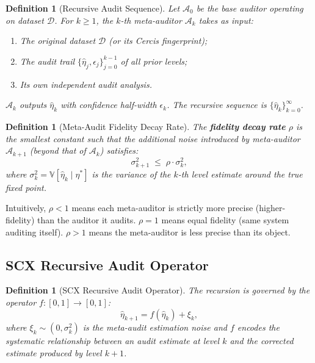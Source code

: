\documentclass[12pt,a4paper]{article}
\newtheorem{definition}[theorem]{Definition}
\newcommand{\V}{\mathbb{V}}
\newcommand{\cD}{\mathcal{D}}
\newcommand{\cA}{\mathcal{A}}
\begin{document}
\begin{definition}[Recursive Audit Sequence]
\label{def:recursive-seq}
Let $\cA_0$ be the base auditor operating on dataset $\cD$.
For $k\geq1$, the $k$-th meta-auditor $\cA_k$ takes as input:
\begin{enumerate}[label=(\roman*)]
    \item The original dataset $\cD$ (or its Cercis fingerprint);
    \item The audit trail $\{\hat{\eta}_j,\epsilon_j\}_{j=0}^{k-1}$ of all
          prior levels;
    \item Its own independent audit analysis.
\end{enumerate}
$\cA_k$ outputs $\hat{\eta}_k$ with confidence half-width $\epsilon_k$.
The recursive sequence is $\{\hat{\eta}_k\}_{k=0}^\infty$.
\end{definition}

\begin{definition}[Meta-Audit Fidelity Decay Rate]
\label{def:rho}
The \textbf{fidelity decay rate} $\rho$ is the smallest constant such that the
additional noise introduced by meta-auditor $\cA_{k+1}$ (beyond that of
$\cA_k$) satisfies:
\begin{equation}\label{eq:rho-def}
    \sigma_{k+1}^2 \;\leq\; \rho \cdot \sigma_k^2,
\end{equation}
where $\sigma_k^2 = \V[\hat{\eta}_k\mid\eta^*]$ is the variance of the $k$-th
level estimate around the true fixed point.
\end{definition}

Intuitively, $\rho<1$ means each meta-auditor is strictly more precise
(higher-fidelity) than the auditor it audits.  $\rho=1$ means equal fidelity
(same system auditing itself).  $\rho>1$ means the meta-auditor is less
precise than its object.

\subsection{SCX Recursive Audit Operator}

\begin{definition}[SCX Recursive Audit Operator]
\label{def:operator}
The recursion is governed by the operator $f:[0,1]\to[0,1]$:
\begin{equation}\label{eq:f-operator}
    \hat{\eta}_{k+1} = f(\hat{\eta}_k) + \xi_k,
\end{equation}
where $\xi_k\sim(0,\sigma_k^2)$ is the meta-audit estimation noise and $f$
encodes the systematic relationship between an audit estimate at level $k$
and the corrected estimate produced by level $k+1$.
\end{definition}
\end{document}
